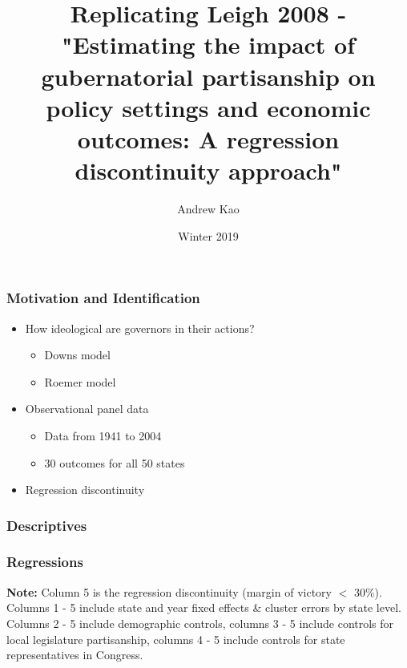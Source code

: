 \documentclass{beamer}
\title{Replicating Leigh 2008 - "Estimating the impact of gubernatorial partisanship on policy settings
and economic outcomes: A regression discontinuity approach" }
\subtitle{}
\author{Andrew Kao}
\institute{University of Chicago}
\date{Winter 2019}
\begin{document}
 
\frame{\titlepage}
 
\begin{frame}
\frametitle{Motivation and Identification}

\begin{itemize}
\item How ideological are governors in their actions?
	\begin{itemize}
	\item Downs model 
	\item Roemer model
	\end{itemize} 
\item Observational panel data
	\begin{itemize}
	\item Data from 1941 to 2004
	\item 30 outcomes for all 50 states
	\end{itemize}
\item Regression discontinuity
\end{itemize}
\end{frame}

\begin{frame}
\frametitle{Descriptives}
   
\scriptsize
    \renewcommand\arraystretch{0.75}
    \setlength\tabcolsep{2pt}



\end{frame}

\begin{frame}
\frametitle{Regressions}

\scriptsize
    \renewcommand\arraystretch{0.65}
    \setlength\tabcolsep{1pt}
    \tiny

\textbf{Note:} Column 5 is the regression discontinuity (margin of victory $<$ 30\%). Columns 1 - 5 include state and year fixed effects \& cluster errors by state level. Columns 2 - 5 include demographic controls, columns 3 - 5 include controls for local legislature partisanship, columns 4 - 5 include controls for state representatives in Congress.

\end{frame}
\end{document}
